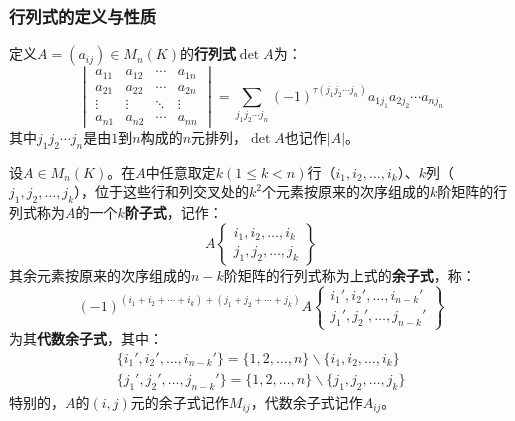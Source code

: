 \subsubsection{行列式的定义与性质}
\begin{definition}
	定义$A=(a_{ij})\in M_{n}(K)$的\textbf{行列式}$\det A$为：
	\begin{equation*}
		\begin{vmatrix}
			a_{11} & a_{12} & \cdots & a_{1n} \\
			a_{21} & a_{22} & \cdots & a_{2n} \\
			\vdots & \vdots & \ddots & \vdots \\
			a_{n1} & a_{n2} & \cdots & a_{nn}
		\end{vmatrix}=
		\sum_{j_1j_2\cdots j_n}^{}(-1)^{\tau(j_1j_2\cdots j_n)}a_{1j_1}a_{2j_2}\cdots a_{nj_n}
	\end{equation*}
	其中$j_1j_2\cdots j_n$是由$1$到$n$构成的$n$元排列，$\det A$也记作$|A|$。
\end{definition} 
\begin{definition}
	设$A\in M_{n}(K)$。在$A$中任意取定$k(1\leqslant k<n)$行（$i_1,i_2,\dots,i_k$）、$k$列（$j_1,j_2,\dots,j_k$），位于这些行和列交叉处的$k^2$个元素按原来的次序组成的$k$阶矩阵的行列式称为$A$的一个\textbf{$k$阶子式}，记作：
	\begin{equation*}
		A\left\{ \begin{array}{l}
			i_1,i_2,\dots,i_k \\
			j_1,j_2,\dots,j_k
		\end{array} \right\}
	\end{equation*}
	其余元素按原来的次序组成的$n-k$阶矩阵的行列式称为上式的\textbf{余子式}，称：
	\begin{equation*}
		(-1)^{(i_1+i_2+\cdots+i_k)+(j_1+j_2+\cdots+j_k)}A\left\{ \begin{array}{l}
			i_1',i_2',\dots,i_{n-k}' \\
			j_1',j_2',\dots,j_{n-k}'
		\end{array} \right\}
	\end{equation*}
	为其\textbf{代数余子式}，其中：
	\begin{gather*}
		\{i_1',i_2',\dots,i_{n-k}'\}=\{1,2,\dots,n\}\backslash\{i_1,i_2,\dots,i_k\} \\
		\{j_1',j_2',\dots,j_{n-k}'\}=\{1,2,\dots,n\}\backslash\{j_1,j_2,\dots,j_k\}
	\end{gather*}
	特别的，$A$的$(i,j)$元的余子式记作$M_{ij}$，代数余子式记作$A_{ij}$。
\end{definition}
